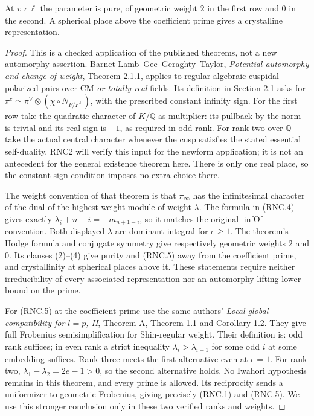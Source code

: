 \documentclass[11pt,a4paper]{article}
\numberwithin{equation}{section}
\theoremstyle{remark}\newtheorem{remark}[theorem]{Remark}
\begin{document}
At $v\nmid\ell$ the parameter is pure, of geometric weight $2$
in the first row and $0$ in the second.  A spherical place above
the coefficient prime gives a crystalline representation.
\begin{proof}
This is a checked application of the published theorems, not a
new automorphy assertion.  Barnet-Lamb--Gee--Geraghty--Taylor,
\emph{Potential automorphy and change of weight}, Theorem 2.1.1,
applies to regular algebraic cuspidal polarized pairs over CM
\emph{or totally real} fields.  Its definition in Section 2.1
asks for $\pi^c\simeq\pi^\vee\otimes(\chi\circ N_{F/F^+})$,
with the prescribed constant infinity sign.  For the first row
take the quadratic character of $K/\mathbb Q$ as multiplier:
its pullback by the norm is trivial and its real sign is $-1$,
as required in odd rank.  For rank two over $\mathbb Q$ take
the actual central character whenever the cusp satisfies
the stated essential self-duality.  RNC2 will verify this
input for the newform application; it is not an antecedent
for the general existence theorem here.  There is only one real place, so the
constant-sign condition imposes no extra choice there.

The weight convention of that theorem is that $\pi_\infty$
has the infinitesimal character of the dual of the highest-weight
module of weight $\lambda$.  The formula in (RNC.4) gives exactly
$\lambda_i+n-i=-m_{n+1-i}$, so it matches the original
$\operatorname{infOf}$ convention.  Both displayed $\lambda$
are dominant integral for $e\geq1$.  The theorem's Hodge formula
and conjugate symmetry give respectively geometric weights $2$
and $0$.  Its clauses (2)--(4) give purity and (RNC.5) away from
the coefficient prime, and crystallinity at spherical places
above it.  These statements require neither irreducibility of
every associated representation nor an automorphy-lifting lower
bound on the prime.

For (RNC.5) at the coefficient prime use the same authors'
\emph{Local-global compatibility for $l=p$, II}, Theorem A,
Theorem 1.1 and Corollary 1.2.  They give full Frobenius
semisimplification for Shin-regular weight.  Their definition is:
odd rank suffices; in even rank a strict inequality
$\lambda_i>\lambda_{i+1}$ for some odd $i$ at some embedding
suffices.  Rank three meets the first alternative even at $e=1$.
For rank two, $\lambda_1-\lambda_2=2e-1>0$, so the second
alternative holds.  No Iwahori hypothesis remains in this
theorem, and every prime is allowed.  Its reciprocity sends a
uniformizer to geometric Frobenius, giving precisely (RNC.1)
and (RNC.5).  We use this stronger conclusion only in these
two verified ranks and weights.
\end{proof}
\end{document}
